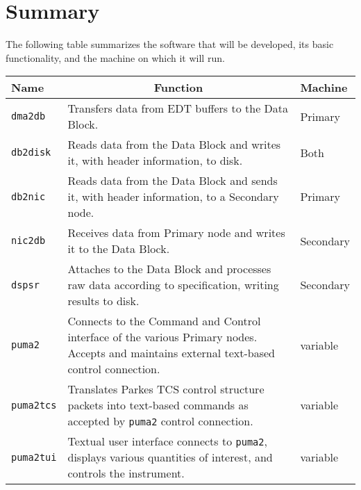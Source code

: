 \chapter{Summary}

The following table summarizes the software that will be developed,
its basic functionality, and the machine on which it will run.

\vspace{5mm}

\begin{tabular}{l|p{8cm}|l}

Name & \multicolumn{1}{c}{Function} & Machine \\ \hline

{\tt dma2db} & Transfers data from EDT buffers to the Data Block.
	& Primary \\

{\tt db2disk} & Reads data from the Data Block and writes it, with
	header information, to disk. & Both \\

{\tt db2nic} & Reads data from the Data Block and sends it, with
	header information, to a Secondary node. & Primary \\

{\tt nic2db} & Receives data from Primary node and writes it to the 
	Data Block. & Secondary \\

{\tt dspsr} & Attaches to the Data Block and processes raw data
	according to specification, writing results to disk. &
	Secondary \\

{\tt puma2} & Connects to the Command and Control interface of the
	various Primary nodes.  Accepts and maintains external
	text-based control connection.  & variable \\

{\tt puma2tcs} & Translates Parkes TCS control structure packets into
	text-based commands as accepted by {\tt puma2} control
	connection.  & variable \\

{\tt puma2tui} & Textual user interface connects to {\tt puma2},
	displays various quantities of interest, and controls
	the instrument. & variable \\

\end{tabular}
